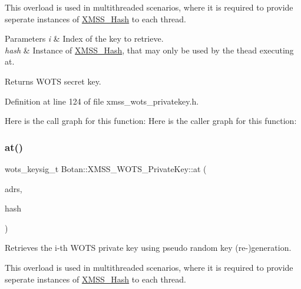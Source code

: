 This overload is used in multithreaded scenarios, where it is required to provide seperate instances of \mbox{\hyperlink{class_botan_1_1_x_m_s_s___hash}{X\+M\+S\+S\+\_\+\+Hash}} to each thread.


\begin{DoxyParams}{Parameters}
{\em i} & Index of the key to retrieve. \\
\hline
{\em hash} & Instance of \mbox{\hyperlink{class_botan_1_1_x_m_s_s___hash}{X\+M\+S\+S\+\_\+\+Hash}}, that may only be used by the thead executing at.\\
\hline
\end{DoxyParams}
\begin{DoxyReturn}{Returns}
W\+O\+TS secret key. 
\end{DoxyReturn}


Definition at line 124 of file xmss\+\_\+wots\+\_\+privatekey.\+h.

Here is the call graph for this function\+:
Here is the caller graph for this function\+:
\mbox{\label{class_botan_1_1_x_m_s_s___w_o_t_s___private_key_a5d454383924b5d2613cbce18417a9808}} 
\subsubsection{\texorpdfstring{at()}{at()}\hspace{0.1cm}{\footnotesize\ttfamily [2/2]}}
{\footnotesize\ttfamily wots\+\_\+keysig\+\_\+t Botan\+::\+X\+M\+S\+S\+\_\+\+W\+O\+T\+S\+\_\+\+Private\+Key\+::at (\begin{DoxyParamCaption}\item[{const \mbox{\hyperlink{class_botan_1_1_x_m_s_s___address}{X\+M\+S\+S\+\_\+\+Address}} \&}]{adrs,  }\item[{\mbox{\hyperlink{class_botan_1_1_x_m_s_s___hash}{X\+M\+S\+S\+\_\+\+Hash}} \&}]{hash }\end{DoxyParamCaption})\hspace{0.3cm}{\ttfamily [inline]}}

Retrieves the i-\/th W\+O\+TS private key using pseudo random key (re-\/)generation.

This overload is used in multithreaded scenarios, where it is required to provide seperate instances of \mbox{\hyperlink{class_botan_1_1_x_m_s_s___hash}{X\+M\+S\+S\+\_\+\+Hash}} to each thread.


